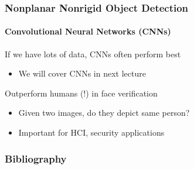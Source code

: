\documentclass[xetex,professionalfont]{beamer}
\let\oldemph\emph
\renewcommand\emph[1]{\textcolor{tuwcvl_inf_red}{#1}}
\begin{document}

\begin{frame}
\frametitle{Nonplanar Nonrigid Object Detection}
\framesubtitle{Convolutional Neural Networks (CNNs)}

If we have lots of data, CNNs often perform best
\begin{itemize}
    \item We will cover CNNs in next lecture
\end{itemize}

\bigskip
Outperform humans (!) in \emph{face verification}
\begin{itemize}
    \item Given two images, do they depict same person?
    \item Important for HCI, security applications
\end{itemize}

\end{frame}


\renewcommand\emph[1]{\oldemph{#1}}

\begin{frame}[allowframebreaks=0.9]
\frametitle{Bibliography}

\printbibliography

\end{frame}
\end{document}
